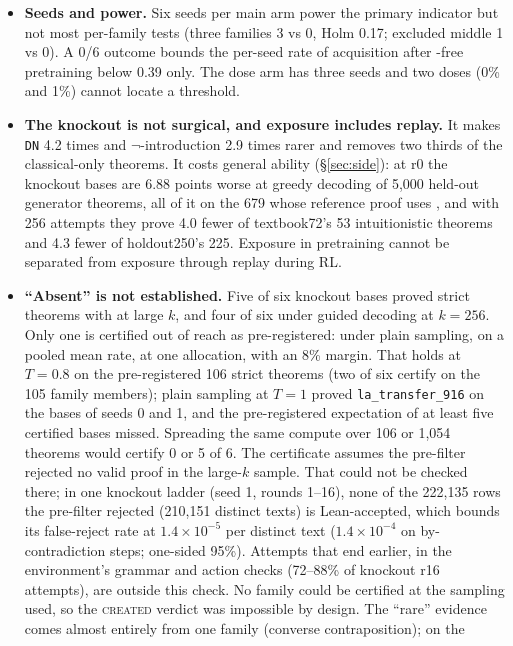 \begin{itemize}
dynamics, is also a post hoc measure: it was defined after round 3 of the experiment and was not pre-registered.
\item \textbf{Seeds and power.} Six seeds per main arm power the primary indicator but not most per-family tests (three
families 3 vs 0, Holm 0.17; excluded middle 1 vs 0). A 0/6 outcome bounds the per-seed rate of acquisition after
\sig-free pretraining below 0.39 only. The dose arm has three seeds and two doses (0\% and 1\%) cannot locate a threshold.
\item \textbf{The knockout is not surgical, and exposure includes replay.} It makes \texttt{DN} 4.2 times and $\neg$-introduction
2.9 times rarer and removes two thirds of the classical-only theorems. It costs general ability
(\S\ref{sec:side}): at r0 the knockout bases are 6.88 points worse at greedy decoding of 5,000 held-out generator
theorems, all of it on the 679 whose reference proof uses \sig{}, and with 256 attempts they prove 4.0 fewer of
textbook72's 53 intuitionistic theorems and 4.3 fewer of holdout250's 225. Exposure in pretraining cannot be separated from exposure through replay during RL.
\item \textbf{``Absent'' is not established.} Five of six knockout bases proved strict theorems with \sig{} at large
$k$, and four of six under guided decoding at $k = 256$. Only one is certified out of reach as pre-registered: under plain
sampling, on a pooled mean rate, at one allocation, with an 8\% margin. That holds at $T = 0.8$ on the
pre-registered 106 strict theorems (two of six certify on the 105 family members); plain sampling at $T = 1$ proved
\texttt{la\_transfer\_916} on the bases of seeds 0 and 1, and the pre-registered expectation of at least five certified
bases missed. Spreading the same compute over 106 or 1,054
theorems would certify 0 or 5 of 6. The certificate assumes the pre-filter rejected no valid proof in the large-$k$
sample. That could not be checked there; in one knockout ladder (seed 1, rounds 1--16), none of the 222,135 rows
the pre-filter rejected (210,151 distinct texts) is Lean-accepted, which bounds its false-reject rate at
$1.4\times10^{-5}$ per distinct text ($1.4\times10^{-4}$ on by-contradiction steps; one-sided 95\%). Attempts that end
earlier, in the environment's grammar and action checks (72--88\% of knockout r16 attempts), are outside this check. No family could be certified at the sampling used, so the \textsc{created} verdict
was impossible by design. The ``rare'' evidence comes almost entirely from one family (converse contraposition); on the

\end{itemize}
